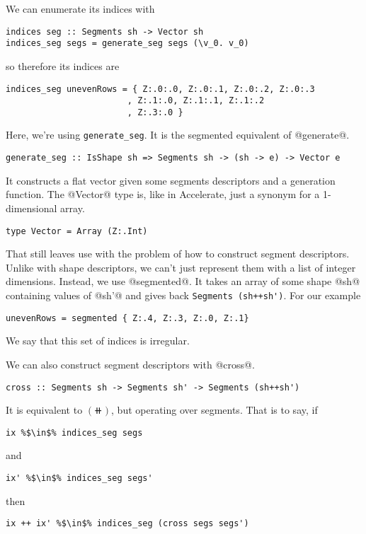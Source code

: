 We can enumerate its indices with
%
\begin{lstlisting}[style=ndp]
indices seg :: Segments sh -> Vector sh
indices_seg segs = generate_seg segs (\v_0. v_0)
\end{lstlisting}
%
so therefore its indices are
%
\begin{lstlisting}[style=ndp]
indices_seg unevenRows = { Z:.0:.0, Z:.0:.1, Z:.0:.2, Z:.0:.3
                        , Z:.1:.0, Z:.1:.1, Z:.1:.2
                        , Z:.3:.0 }
\end{lstlisting}
%
Here, we're using \lstinline[style=ndp]{generate_seg}. It is the segmented equivalent of @generate@.
%
\begin{lstlisting}[style=ndp]
generate_seg :: IsShape sh => Segments sh -> (sh -> e) -> Vector e
\end{lstlisting}
%
It constructs a flat vector given some segments descriptors and a generation function. The @Vector@ type is, like in Accelerate, just a synonym for a 1-dimensional array.
%
\begin{lstlisting}[style=ndp]
type Vector = Array (Z:.Int)
\end{lstlisting}

That still leaves use with the problem of how to construct segment descriptors. Unlike with shape descriptors, we can't just represent them with a list of integer dimensions. Instead, we use @segmented@. It takes an array of some shape @sh@ containing values of @sh'@ and gives back \lstinline[style=ndp]{Segments (sh++sh')}. For our example
%
\begin{lstlisting}[style=ndp]
unevenRows = segmented { Z:.4, Z:.3, Z:.0, Z:.1}
\end{lstlisting}
%
We say that this set of indices is irregular.

We can also construct segment descriptors with @cross@.
%
\begin{lstlisting}[style=ndp]
cross :: Segments sh -> Segments sh' -> Segments (sh++sh')
\end{lstlisting}
%
It is equivalent to $(\doubleplus)$, but operating over segments. That is to say, if
%
\begin{lstlisting}[style=ndp]
ix %$\in$% indices_seg segs
\end{lstlisting}
%
and
%
\begin{lstlisting}[style=ndp]
ix' %$\in$% indices_seg segs'
\end{lstlisting}
%
then
%
\begin{lstlisting}[style=ndp]
ix ++ ix' %$\in$% indices_seg (cross segs segs')
\end{lstlisting}

